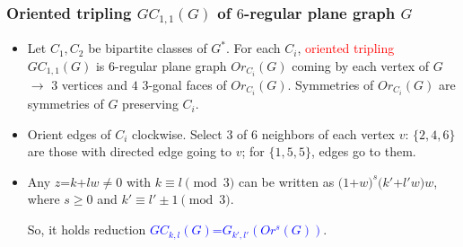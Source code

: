 \documentclass{beamer}
\begin{document}
\begin{frame}\frametitle{Oriented tripling $GC_{1,1}(G)$ of $6$-regular 
plane
graph $G$}
\vspace{-3.5mm}
\begin{itemize}
\item
Let  $C_1,C_2$ be bipartite classes of  
$G^{*}$.
For each  $C_i$, \textcolor{red}{oriented tripling}   
 $GC_{1,1}(G)$ is $6$-regular plane graph 
$Or_{C_i}(G)$ coming by
each vertex of $G$ $\to$
$3$ vertices
and $4$ $3$-gonal faces of $Or_{C_i}(G)$.
Symmetries of $Or_{C_i}(G)$ are symmetries of $G$ preserving $C_i$.
\item 
Orient edges of $C_i$ clockwise.
Select $3$ of $6$
neighbors of each vertex $v$: $\{2,4,6\}$ are those with  
directed edge going to $v$; for $\{1,5,5\}$, edges go  to them.
\end{itemize}

\begin{center}
\begin{minipage}[b]{45mm}\centering
{}\par
\end{minipage}
\end{center}

\begin{itemize}  
\item Any $z$=$k$+$l w$$\not=$$0$ with  
$k$$\equiv $$l\pmod 3$ can be written as  $(1$+$w)^s(k'$+$l'w)w$, 
where $s$$\geq $$0$ and 
$k'$$\equiv $$l'\pm 1$$ \pmod 3$.

So, it holds reduction 
\textcolor{blue}{$GC_{k,l}(G)$=$G_{k',l'}(Or^s(G))$}.
\end{itemize}


\end{frame}
\end{document}
